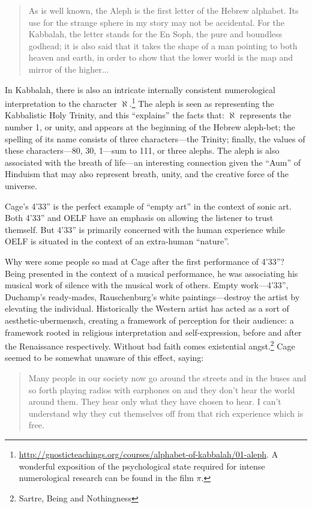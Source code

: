 \documentclass{thesis}
\begin{document}
	\begin{quote}
	As is well known, the Aleph is the first letter of the Hebrew alphabet. Its use for the strange sphere in my story may not be accidental. For the Kabbalah, the letter stands for the En Soph, the pure and boundless godhead; it is also said that it takes the shape of a man pointing to both heaven and earth, in order to show that the lower world is the map and mirror of the higher...
	\end{quote}
	
	In Kabbalah, there is also an intricate internally consistent numerological interpretation to the character $\aleph$.\footnote{\url{http://gnosticteachings.org/courses/alphabet-of-kabbalah/01-aleph}. A wonderful exposition of the psychological state required for intense numerological research can be found in the film $\pi$.} The aleph is seen as representing the Kabbalistic Holy Trinity, and this ``explains'' the facts that: $\aleph$ represents the number 1, or unity, and appears at the beginning of the Hebrew aleph-bet; the spelling of its name consists of three characters---the Trinity; finally, the values of these characters---80, 30, 1---sum to 111, or three alephs. The aleph is also associated with the breath of life---an interesting connection given the ``Aum'' of Hinduism that may also represent breath, unity, and the creative force of the universe.
	
	Cage's 4'33'' is the perfect example of ``empty art'' in the context of sonic art.\cite{larry_j_solomon_sounds_1998} Both 4'33'' and OELF have an emphasis on allowing the listener to trust themself. But 4'33'' is primarily concerned with the human experience while OELF is situated in the context of an extra-human ``nature''.
	
	Why were some people so mad at Cage after the first performance of 4'33''? Being presented in the context of a musical performance, he was associating his musical work of silence with the musical work of others. Empty work---4'33'', Duchamp's ready-mades, Rauschenburg's white paintings---destroy the artist by elevating the individual. Historically the Western artist has acted as a sort of aesthetic-ubermensch, creating a framework of perception for their audience: a framework rooted in religious interpretation and self-expression, before and after the Renaissance respectively. Without bad faith comes existential angst.\footnote{Sartre, Being and Nothingness} Cage seemed to be somewhat unaware of this effect, saying:
	
\begin{quote}
	Many people in our society now go around the streets and in the buses and so forth playing radios with earphones on and they don't hear the world around them. They hear only what they have chosen to hear. I can't understand why they cut themselves off from that rich experience which is free.
\end{quote}
\end{document}
